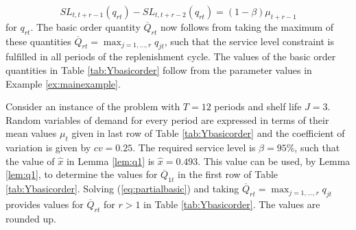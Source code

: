 \begin{equation}
\label{eq:partialbasic}
SL_{t,t+r-1}(q_{rt})-SL_{t,t+r-2}(q_{rt})=(1-\beta)\mu_{t+r-1}
 \end{equation}
 for $q_{rt}$. The basic order quantity $\overline Q_{rt}$ now follows from taking the maximum of these quantities $\overline Q_{rt}=\max_{j=1,\ldots,r}q_{jt}$, such that the service level constraint is fulfilled in all periods of the replenishment cycle. The values of the basic order quantities in Table %
 \ref{tab:Ybasicorder} follow from the parameter values in Example \ref{ex:mainexample}.



\begin{example}
\label{ex:mainexample}

Consider an instance of the problem with $T=12$ periods and shelf life $J=3$. Random variables of demand for every period are expressed in terms of their mean values $\mu_t$ given in last row of Table \ref{tab:Ybasicorder} and the coefficient of variation is given by $cv=0.25$. The required service level is $\beta=95\%$, such that the value of $\hat x$ in Lemma \ref{lem:q1} is $\hat x=0.493$. This value can be used, by Lemma \ref{lem:q1}, to determine the values for $\overline Q_{1t}$ in the first row of Table  \ref{tab:Ybasicorder}. Solving (\ref{eq:partialbasic}) and taking  $\overline Q_{rt}=\max_{j=1,\ldots,r}q_{jt}$ provides values for $\overline Q_{rt}$ for $r>1$ in Table \ref{tab:Ybasicorder}. The values are rounded up.
%
\end{example}



